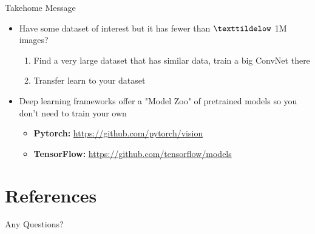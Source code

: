\documentclass[serif, aspectratio=169]{beamer}
\begin{document}
\begin{frame}{Takehome Message}
	\begin{itemize}
		\item Have some dataset of interest but it has fewer than $\texttildelow$ 1M images?
		\begin{enumerate}
			\item Find a very large dataset that has similar data, train a big ConvNet there
			\item Transfer learn to your dataset
		\end{enumerate}
		\item Deep learning frameworks offer a "Model Zoo" of pretrained models so you don't need to train your own
		\begin{itemize}
			\item \textbf{Pytorch:} \href{https://github.com/pytorch/vision}{\color{blue} https://github.com/pytorch/vision}
			\item \textbf{TensorFlow:} \href{https://github.com/tensorflow/models}{\color{blue} https://github.com/tensorflow/models}
		\end{itemize}

	\end{itemize}
\end{frame}

\section{References}

\begin{frame}[allowframebreaks]
	
	
	\nocite{*} %
\end{frame}


\begin{frame}
	\begin{center}
		{\Huge Any Questions?}
	\end{center}
\end{frame}
\end{document}
